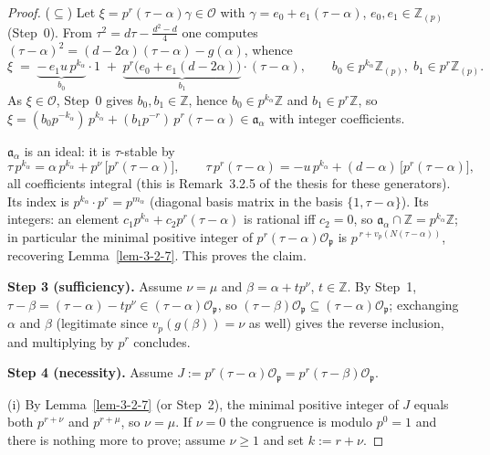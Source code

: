 \begin{proof}
  ($\subseteq$) Let $\xi = p^{r}(\tau - \alpha)\gamma \in \mathcal{O}$ with
  $\gamma = e_0 + e_1(\tau - \alpha)$, $e_0, e_1 \in \mathbb{Z}_{(p)}$ (Step~0).
  From $\tau^2 = d\tau - \tfrac{d^2 - d}{4}$ one computes
  $(\tau - \alpha)^2 = (d - 2\alpha)(\tau - \alpha) - g(\alpha)$, whence
  \[
    \xi \;=\; \underbrace{-\,e_1 u\, p^{k_\alpha}}_{b_0}\cdot 1
    \;+\; \underbrace{p^{r}\bigl(e_0 + e_1(d - 2\alpha)\bigr)}_{b_1}\cdot(\tau - \alpha),
    \qquad b_0 \in p^{k_\alpha}\mathbb{Z}_{(p)},\; b_1 \in p^{r}\mathbb{Z}_{(p)}.
  \]
  As $\xi \in \mathcal{O}$, Step~0 gives $b_0, b_1 \in \mathbb{Z}$, hence
  $b_0 \in p^{k_\alpha}\mathbb{Z}$ and $b_1 \in p^{r}\mathbb{Z}$, so
  $\xi = (b_0 p^{-k_\alpha})\,p^{k_\alpha} + (b_1 p^{-r})\,p^{r}(\tau - \alpha)
  \in \mathfrak{a}_\alpha$ with integer coefficients.

  $\mathfrak{a}_\alpha$ is an ideal: it is $\tau$-stable by
  \[
    \tau\, p^{k_\alpha} = \alpha\, p^{k_\alpha} + p^{\nu}\,\bigl[p^{r}(\tau-\alpha)\bigr],
    \qquad
    \tau\, p^{r}(\tau - \alpha) = -u\, p^{k_\alpha} + (d - \alpha)\,\bigl[p^{r}(\tau-\alpha)\bigr],
  \]
  all coefficients integral (this is Remark~3.2.5 of the thesis for these
  generators). Its index is $p^{k_\alpha}\cdot p^{r} = p^{m_\alpha}$ (diagonal basis
  matrix in the basis $\{1, \tau - \alpha\}$). Its integers: an element
  $c_1 p^{k_\alpha} + c_2 p^{r}(\tau - \alpha)$ is rational iff $c_2 = 0$, so
  $\mathfrak{a}_\alpha \cap \mathbb{Z} = p^{k_\alpha}\mathbb{Z}$; in particular the
  minimal positive integer of $p^{r}(\tau - \alpha)\mathcal{O}_\mathfrak{p}$ is
  $p^{\,r + v_p(N(\tau - \alpha))}$, recovering Lemma~\ref{lem-3-2-7}. This proves
  the claim.

  \textbf{Step 3 (sufficiency).}
  Assume $\nu = \mu$ and $\beta = \alpha + t p^{\nu}$, $t \in \mathbb{Z}$. By Step~1,
  $\tau - \beta = (\tau - \alpha) - t p^{\nu} \in (\tau - \alpha)\mathcal{O}_\mathfrak{p}$,
  so $(\tau - \beta)\mathcal{O}_\mathfrak{p} \subseteq (\tau - \alpha)\mathcal{O}_\mathfrak{p}$;
  exchanging $\alpha$ and $\beta$ (legitimate since $v_p(g(\beta)) = \nu$ as well)
  gives the reverse inclusion, and multiplying by $p^{r}$ concludes.

  \textbf{Step 4 (necessity).}
  Assume $J := p^r(\tau - \alpha)\mathcal{O}_\mathfrak{p}
  = p^r(\tau - \beta)\mathcal{O}_\mathfrak{p}$.

  (i) By Lemma~\ref{lem-3-2-7} (or Step~2), the minimal positive integer of $J$
  equals both $p^{r+\nu}$ and $p^{r+\mu}$, so $\nu = \mu$. If $\nu = 0$ the
  congruence is modulo $p^{0} = 1$ and there is nothing more to prove; assume
  $\nu \geq 1$ and set $k := r + \nu$.


\end{proof}
